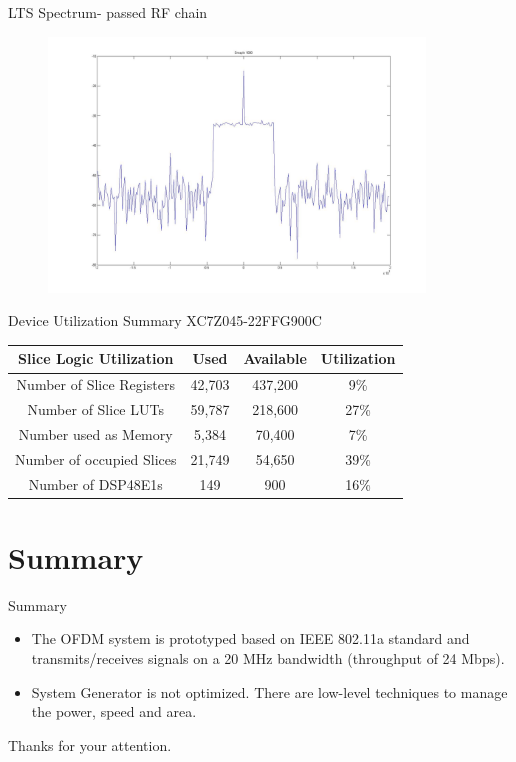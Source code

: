 \documentclass{beamer}
\begin{document}
\begin{frame}{LTS Spectrum- passed RF chain}
\begin{figure}
\centering
\includegraphics[width=10cm]{content/fig/Rfbase.JPG}
\end{figure}
\end{frame}

\begin{frame}{Device Utilization Summary }{XC7Z045-22FFG900C}

\begin{table}
\centering
\vspace{0.5cm}
\begin{tabular}{c|c|c|c}
Slice Logic Utilization&Used&Available&Utilization\\ \hline
Number of Slice Registers&42,703&437,200&9\% \\
Number of Slice LUTs&59,787&218,600&27\% \\
Number used as Memory&5,384&70,400&7\% \\
Number of occupied Slices&21,749&54,650&39\% \\
Number of DSP48E1s&149&900&16\% \\
\end{tabular}
\end{table}

\end{frame}


\section*{Summary}

\begin{frame}{Summary}
  \begin{itemize}
  \item
   The OFDM system is prototyped based on IEEE 802.11a standard and transmits/receives signals on a 20 MHz bandwidth (throughput of 24 Mbps).
  \item
    System Generator is not optimized. There are low-level techniques to manage the power, speed and area.
  \end{itemize}
  
\end{frame}

\begin{frame}
\centering
   Thanks for your attention.

\end{frame}
\end{document}
